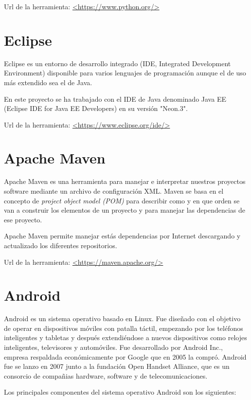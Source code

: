 Url de la herramienta: \url{<https://www.python.org/>}

\section{Eclipse}

Eclipse es un entorno de desarrollo integrado (IDE, Integrated Development Environment) disponible para varios lenguajes de programación aunque el de uso más extendido sea el de Java. 

En este proyecto se ha trabajado con el IDE de Java denominado Java EE (Eclipse IDE for Java EE Developers) en su versión "Neon.3".

Url de la herramienta: \url{<https://www.eclipse.org/ide/>}

\section{Apache Maven}

Apache Maven es una herramienta para manejar e interpretar nuestros proyectos software mediante un archivo de configuración XML. Maven se basa en el concepto de \textit{project object model (POM)} para describir como y en que orden se van a construir los elementos de un proyecto y para manejar las dependencias de ese proyecto.

Apache Maven permite manejar estás dependencias por Internet descargando y actualizado los diferentes repositorios.\cite{wiki:maven}

Url de la herramienta: \url{<https://maven.apache.org/>}

\section{Android}

Android es un sistema operativo basado en Linux. Fue diseñado con el objetivo de operar en dispositivos móviles con patalla táctil, empezando por los teléfonos inteligentes y tabletas y después extendiéndose a nuevos dispositivos como relojes inteligentes, televisores y automóviles. Fue desarrollado por Android Inc., empresa respaldada económicamente por Google que en 2005 la compró. Android fue se lanzo en 2007 junto a la fundación Open Handset Alliance, que es un consorcio de compañias hardware, software y de telecomunicaciones.\cite{wiki:android}

Los principales componentes del sistema operativo Android son los siguientes:


